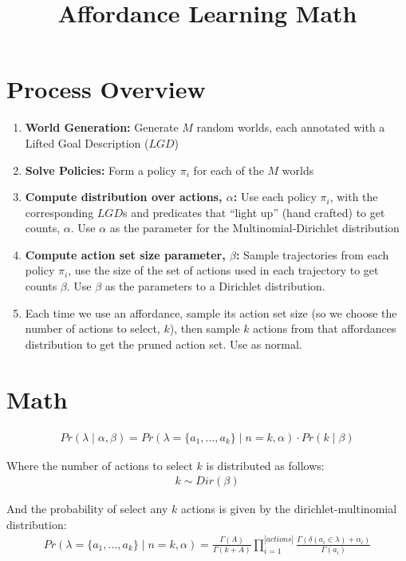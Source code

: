 \documentclass[]{article}
\title{Affordance Learning Math}
\begin{document}
\date{}
\maketitle

\section*{Process Overview}
\begin{enumerate}[1)]
\item {\bf World Generation:} Generate $M$ random worlds, each annotated with a Lifted Goal Description ($LGD$)
\item {\bf Solve Policies:} Form a policy $\pi_i$ for each of the $M$ worlds
\item {\bf Compute distribution over actions, $\alpha$:} Use each policy $\pi_i$, with the corresponding $LGD$s and predicates that ``light up'' (hand crafted) to get counts, $\alpha$. Use $\alpha$ as the parameter for the Multinomial-Dirichlet distribution
\item {\bf Compute action set size parameter, $\beta$:} Sample trajectories from each policy $\pi_i$, use the size of the set of actions used in each trajectory to get counts $\beta$. Use $\beta$ as the parameters to a Dirichlet distribution.
\item Each time we use an affordance, sample its action set size (so we choose the number of actions to select, $k$), then sample $k$ actions from that affordances distribution to get the pruned action set. Use as normal.
\end{enumerate}
\section*{Math}
\begin{align}
	Pr(\lambda \mid \alpha, \beta) = Pr(\lambda = \{a_1, \ldots, a_k\} \mid n = k, \alpha) \cdot Pr(k \mid \beta)
\end{align}

\noindent Where the number of actions to select $k$ is distributed as follows:
\begin{align}
	k \sim Dir(\beta)
\end{align}

\noindent And the probability of select any $k$ actions is given by the dirichlet-multinomial distribution:
\begin{align}
	Pr(\lambda = \{a_1, \ldots, a_k\} \mid n = k, \alpha) = \frac{\Gamma(A)}{\Gamma(k + A)} \prod_{i = 1}^{|actions|} \frac{\Gamma(\delta(a_i \in \lambda) + \alpha_i)}{\Gamma(a_i)} 
\end{align}
\end{document}
